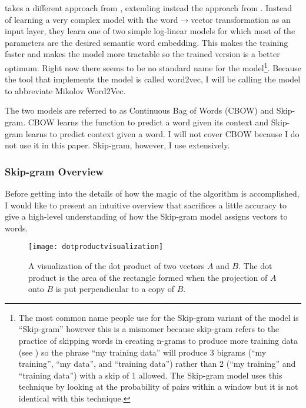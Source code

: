 \citep{Mikolov2013b} takes a different approach from \citep{Bengio2003},
extending instead the approach from \citep{Mikolov2007}. 
Instead of learning a very 
complex model with the word$\rightarrow$vector transformation as an input layer, they
learn one of two simple log-linear models for which most of the parameters
are the desired semantic word embedding. This makes the training faster and
makes the model more tractable so the trained version is a better optimum.
Right now there seems to be no standard name for the model\footnote{The most 
common name people use for the
Skip-gram variant of the model is ``Skip-gram'' however this is a misnomer 
because skip-gram refers to the practice of skipping words in creating n-grams
to produce more training data (see \citealt{Guthrie2006}) so the phrase 
``my training data'' will produce 3 bigrams (``my training'', ``my data'', 
and ``training data'') rather than 2 (``my training'' and ``training data'')
with a skip of 1 allowed. The Skip-gram model uses this technique by looking
at the probability of pairs within a window but it is not identical with this
technique.
}. Because the tool that implements the model is called word2vec, I will be 
calling the model \modelname{} to abbreviate 
Mikolov Word2Vec.

The two models are referred to as Continuous Bag of Words (CBOW) and 
Skip-gram. CBOW learns the function to predict a word given its context and
Skip-gram learns to predict context given a word. I will not cover CBOW because
I do not use it in this paper. Skip-gram, however, I use extensively. 

\subsubsection{Skip-gram Overview}

Before getting into the details of how the magic of the algorithm is 
accomplished, I would like to present an intuitive overview that sacrifices 
a little accuracy to give a high-level understanding of how the Skip-gram model
assigns vectors to words.

\begin{figure}[tbp]
  \texttt{[image: dotproductvisualization]}
  \caption{A visualization of the dot product of two vectors $A$ and $B$. The 
  dot product is the area of the rectangle formed when the projection of $A$
  onto $B$ is put perpendicular to a copy of $B$.}
  \label{fig:dotproductvisualization}
\end{figure}

